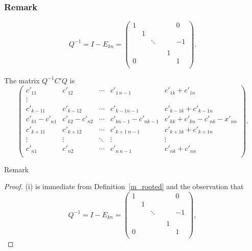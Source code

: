 \documentclass[]{beamer}
\theoremstyle{plain}
\theoremstyle{definition}
\begin{document}
\begin{frame}
    \frametitle{Remark}

    $$Q^{-1}=I-E_{kn}=\begin{pmatrix}
    1 &  & & &  & 0 \\
    & 1 &  &      &  &  \\
    &  & \ddots & &  & -1 \\
    &  &        & &  &  \\
    &  & & & 1 &  \\
    0 &  & & &  & 1 \\
    \end{pmatrix}.$$

    The matrix $Q^{-1}C'Q$ is
    $$\begin{pmatrix}
    c'_{11}     & c'_{12} & \cdots     & c'_{1\ n-1} & c'_{1k}+c'_{1n} \\
    \vdots \\
    c'_{k-11}     & c'_{k-1 2}           & \cdots     & c'_{k-1 n-1} & c'_{k-1k}+c'_{k-1n} \\
    c'_{k1}-c'_{n1} & c'_{k2}-c'_{n2} &\cdots      &c'_{kn-1}-c'_{nk-1}& c'_{kk}+c'_{kn}-c'_{nk}-x'_{nn}\\
    c'_{k+11}     & c'_{k+12}           & \cdots     & c'_{k+1\ n-1} & c'_{k+1k}+c'_{k+1n} \\
    \vdots              & \vdots & \ddots              & \vdots & \vdots \\
    c'_{n1}             & c'_{n2} & \cdots             & c'_{n\ n-1} & c'_{nk}+c'_{nn} \\
    \end{pmatrix}.
    $$
\end{frame}

\begin{frame}{Remark}

	\begin{proof}
        (i) is immediate from Definition~\ref{m_rooted} and the observation that   
        $$Q^{-1}=I-E_{kn}=\begin{pmatrix}
        1 &  & & &  & 0 \\
         & 1 &  &      &  &  \\
         &  & \ddots & &  & -1 \\
         &  &        & &  &  \\
          &  & & & 1 &  \\
        0 &  & & &  & 1 \\
        \end{pmatrix},$$
    \end{proof}
    
\end{frame}
\end{document}
